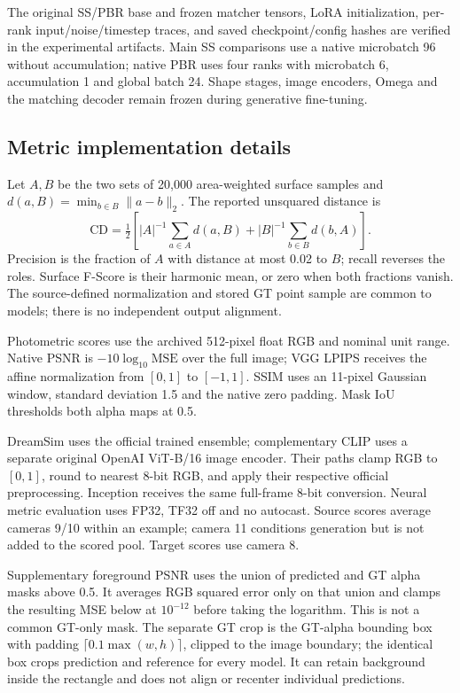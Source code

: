 The original SS/PBR base and frozen matcher tensors, LoRA initialization,
per-rank input/noise/timestep traces, and saved checkpoint/config hashes are
verified in the experimental artifacts. Main SS comparisons use a native
microbatch 96 without accumulation; native PBR uses four ranks with
microbatch 6, accumulation 1 and global batch 24. Shape stages, image encoders,
Omega and the matching decoder remain frozen during generative fine-tuning.

\subsection{Metric implementation details}
Let $A,B$ be the two sets of 20,000 area-weighted surface samples and
$d(a,B)=\min_{b\in B}\lVert a-b\rVert_2$. The reported unsquared distance is
\begin{equation}
 \mathrm{CD}=\tfrac12\left[|A|^{-1}\sum_{a\in A}d(a,B)
                  +|B|^{-1}\sum_{b\in B}d(b,A)\right].
\end{equation}
Precision is the fraction of $A$ with distance at most 0.02 to $B$;
recall reverses the roles. Surface F-Score is their harmonic mean, or zero
when both fractions vanish. The source-defined normalization and stored GT
point sample are common to models; there is no independent output alignment.

Photometric scores use the archived 512-pixel float RGB and nominal unit
range. Native PSNR is $-10\log_{10}\mathrm{MSE}$ over the full image;
VGG LPIPS receives the affine normalization from $[0,1]$ to $[-1,1]$.
SSIM uses an 11-pixel Gaussian window, standard deviation 1.5 and the native
zero padding. Mask IoU thresholds both alpha maps at 0.5.

DreamSim uses the official trained ensemble; complementary CLIP uses a
separate original OpenAI ViT-B/16 image encoder. Their paths clamp RGB to
$[0,1]$, round to nearest 8-bit RGB, and apply their respective official
preprocessing. Inception receives the same full-frame 8-bit conversion.
Neural metric evaluation uses FP32, TF32 off and no autocast. Source scores
average cameras 9/10 within an example; camera 11 conditions generation but
is not added to the scored pool. Target scores use camera 8.

Supplementary foreground PSNR uses the union of predicted and GT alpha
masks above 0.5. It averages RGB squared error only on that union and clamps
the resulting MSE below at $10^{-12}$ before taking the logarithm. This is
not a common GT-only mask. The separate GT crop is the GT-alpha bounding box
with padding $\lceil0.1\max(w,h)\rceil$, clipped to the image boundary;
the identical box crops prediction and reference for every model. It can
retain background inside the rectangle and does not align or recenter
individual predictions.

